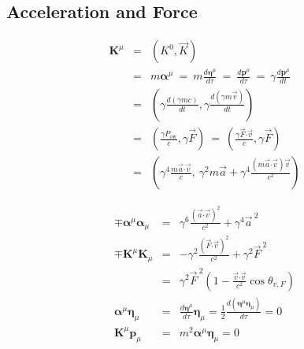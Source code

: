 \documentclass[12pt]{article}
\newcommand{\dotP}{\boldsymbol \cdot}		%
\newcommand{\contra}[1]{\boldsymbol {#1}^{\mu}}	%
\newcommand{\covar}[1]{\boldsymbol {#1}_{\mu}}		%
\begin{document}
\subsection{Acceleration and Force}
\vspace{-5pt}
\begin{minipage}{0.49\textwidth}
	\begin{eqnarray*}
	\contra{K} &=& (K^0, \vec{K}) \\
		&=& m\contra{\alpha} \ =\ m\frac{d\contra{\eta}}{d\tau} \ =\ \frac{d\contra{p}}{d\tau} \ = \ \gamma \frac{d\contra{p}}{dt}\\[5pt]
		&=& \left( \gamma \frac{d(\gamma mc)}{dt}, \gamma \frac{d(\gamma m\vec{v})}{dt} \right) \\[5pt]
		&=& \left( \tfrac{\gamma P_\text{ow}}{c}, \gamma \vec{F} \right) \ =\ 
			\left( \tfrac{\gamma \vec{F} \dotP \vec{v}}{c}, \gamma \vec{F} \right)\\[5pt]
		&=& \left( \gamma^4 \tfrac{m\vec{a} \dotP \vec{v}}{c} , \ 
			\gamma^2 m\vec{a} + \gamma^4 \tfrac{(m\vec{a}\dotP \vec{v})\vec{v}}{c^2} \right)
	\end{eqnarray*}
\end{minipage}
\hfill
\begin{minipage}{0.49\textwidth}
	\begin{eqnarray*}
	\mp \contra{\alpha}\covar{\alpha} &=& \gamma^6 \tfrac{(\vec{a} \dotP \vec{v})^2}{c^2} + \gamma^4 \vec{a}^{\ 2} \\[5pt]
	\mp \contra{K}\covar{K} &=& - \gamma^2 \tfrac{(\vec{F} \dotP \vec{v})^2}{c^2} + \gamma^2 \vec{F}^{\ 2}\\[5pt]
		&=& \gamma^2 \vec{F}^{\ 2} \left( 1-\tfrac{\vec{v}\dotP\vec{v}}{c^2}\cos{\theta_{v,F}} \right) \\[5pt]
	\contra{\alpha}\covar{\eta} &=& \frac{d\contra{\eta}}{d\tau}\covar{\eta} = \frac{1}{2} \frac{d(\contra{\eta}\covar{\eta})}{d\tau} = 0 \\[5pt]
	\contra{K}\covar{p} &=& m^2\contra{\alpha}\covar{\eta} = 0
 	\end{eqnarray*}
\end{minipage}

\end{document}
